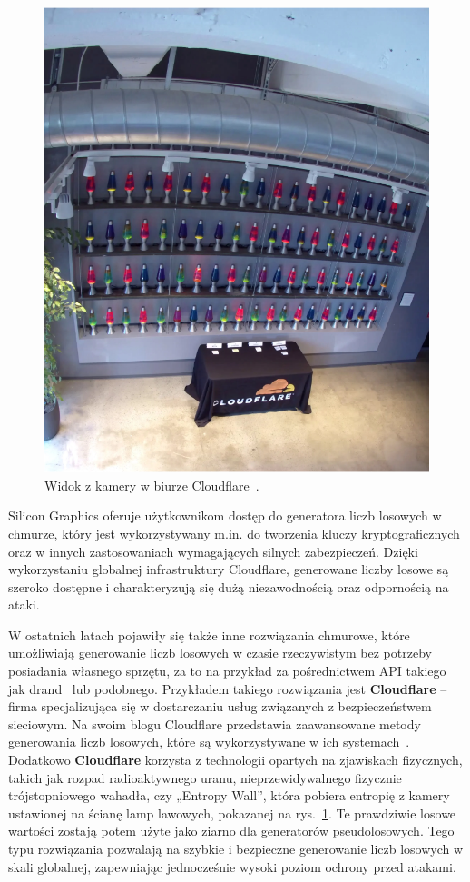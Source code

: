 \begin{figure}[h]
    \centering
    \includegraphics[width=0.4\linewidth]{chapters/02-teoria/figures/lavarandCamera}
    \caption{Widok z kamery w biurze Cloudflare~\cite{cloudflare_lavarand}.}
    \label{fig:lavarand}
\end{figure}

Silicon Graphics oferuje użytkownikom dostęp do generatora liczb losowych w chmurze, który jest wykorzystywany
m.in. do tworzenia kluczy kryptograficznych oraz w innych zastosowaniach wymagających silnych zabezpieczeń.
Dzięki wykorzystaniu globalnej infrastruktury Cloudflare, generowane liczby losowe są
szeroko dostępne i charakteryzują się dużą niezawodnością oraz odpornością na ataki.

W ostatnich latach pojawiły się także inne rozwiązania chmurowe, które umożliwiają generowanie liczb losowych w czasie rzeczywistym bez potrzeby posiadania własnego sprzętu,
za to na przykład za pośrednictwem API takiego jak drand~\cite{drand_documentation} lub podobnego.
Przykładem takiego rozwiązania jest \textbf{Cloudflare} – firma specjalizująca się w dostarczaniu usług związanych z bezpieczeństwem sieciowym.
Na swoim blogu Cloudflare przedstawia zaawansowane metody generowania liczb losowych, które są wykorzystywane w ich systemach~\cite{cloudflare_league_of_entropy}.
Dodatkowo \textbf{Cloudflare} korzysta z technologii opartych na zjawiskach fizycznych, takich jak rozpad radioaktywnego uranu, 
nieprzewidywalnego fizycznie trójstopniowego wahadła, czy „Entropy Wall”, która pobiera entropię z kamery
ustawionej na ścianę lamp lawowych, pokazanej na rys.~\ref{fig:lavarand}.
Te prawdziwie losowe wartości zostają potem użyte jako ziarno dla generatorów pseudolosowych.
Tego typu rozwiązania pozwalają na szybkie i bezpieczne generowanie liczb losowych w skali globalnej, zapewniając jednocześnie wysoki poziom ochrony przed atakami.

